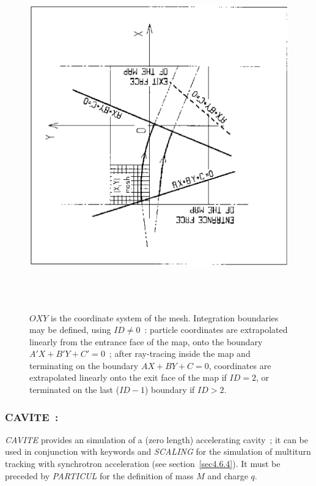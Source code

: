 \begin{figure}[H]
\centerline{\includegraphics[height=15cm,angle=-90]{Fig15.ps}}
\caption[Fig15]{\label{fig15}$OXY $ is the coordinate system of the mesh.
Integration boundaries may be defined, using $ ID\not= 0 $~: particle coordinates are
extrapolated linearly from the entrance face of the map, onto the boundary 
$A'X+B'Y+C'=0$~; after ray-tracing inside the 
map and terminating on the boundary $AX+BY+C=0$, coordinates are
extrapolated linearly onto the exit face of the map if $ID=2$, or 
 terminated on the last ($ID-1$) boundary if $ID >2$.}
\end{figure}
\vfill
\newpage

\subsubsection*{CAVITE~: \CAVITETitl}  \label{CAVITE}
\medskip

\textsl{CAVITE}  provides an  simulation of a (zero length)
accelerating cavity~; it can be used in conjunction with  keywords \REBELOTE{} 
and \textsl{SCALING} for 
the simulation of multiturn tracking with synchrotron acceleration (see section~\ref{sec4.6.4}). 
It must be preceded by \textsl{PARTICUL} for the definition 
of mass $ M $ and charge $ q$.   
\bigskip

